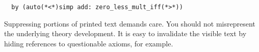 \begin{isabellebody}
\begin{isamarkuptext}
\begin{verbatim}
  by (auto(*<*)simp add: zero_less_mult_iff(*>*))
\end{verbatim}

  \medskip Suppressing portions of printed text demands care.  You
  should not misrepresent the underlying theory development.  It is
  easy to invalidate the visible text by hiding references to
  questionable axioms, for example.%
\end{isamarkuptext}%
\isamarkuptrue%
%
\isadelimtheory
%
\endisadelimtheory
%
\isatagtheory
%
\endisatagtheory
{\isafoldtheory}%
%
\isadelimtheory
%
\endisadelimtheory
\end{isabellebody}%
